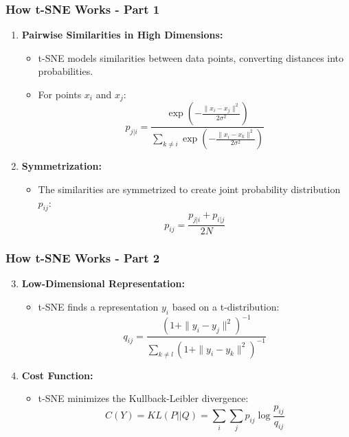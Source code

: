 \documentclass[aspectratio=169]{beamer}
\begin{document}
\begin{frame}[fragile]
    \frametitle{How t-SNE Works - Part 1}
    \begin{enumerate}
        \item \textbf{Pairwise Similarities in High Dimensions:}
        \begin{itemize}
            \item t-SNE models similarities between data points, converting distances into probabilities.
            \item For points \( x_i \) and \( x_j \):
            \begin{equation}
                p_{j|i} = \frac{\exp\left(-\frac{\|x_i - x_j\|^2}{2\sigma^2}\right)}{\sum_{k \neq i} \exp\left(-\frac{\|x_i - x_k\|^2}{2\sigma^2}\right)}
            \end{equation}
        \end{itemize}
        
        \item \textbf{Symmetrization:}
        \begin{itemize}
            \item The similarities are symmetrized to create joint probability distribution \( p_{ij} \):
            \begin{equation}
                p_{ij} = \frac{p_{j|i} + p_{i|j}}{2N}
            \end{equation}
        \end{itemize}
    \end{enumerate}
\end{frame}

\begin{frame}[fragile]
    \frametitle{How t-SNE Works - Part 2}
    \begin{enumerate}
        \setcounter{enumi}{2}
        \item \textbf{Low-Dimensional Representation:}
        \begin{itemize}
            \item t-SNE finds a representation \( y_i \) based on a t-distribution:
            \begin{equation}
                q_{ij} = \frac{(1 + \|y_i - y_j\|^2)^{-1}}{\sum_{k \neq l} (1 + \|y_i - y_k\|^2)^{-1}}
            \end{equation}
        \end{itemize}
        
        \item \textbf{Cost Function:}
        \begin{itemize}
            \item t-SNE minimizes the Kullback-Leibler divergence:
            \begin{equation}
                C(Y) = KL(P || Q) = \sum_{i}\sum_{j} p_{ij} \log\frac{p_{ij}}{q_{ij}}
            \end{equation}
        \end{itemize}
    \end{enumerate}
\end{frame}
\end{document}
